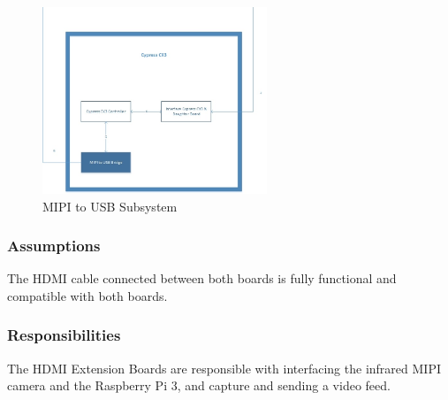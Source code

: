 \begin{figure}[h!]
	\centering
	\includegraphics[width=0.60\textwidth]{images/Cypress_MIPI}
	\caption{MIPI to USB Subsystem}
\end{figure}

\subsubsection{Assumptions}
The HDMI cable connected between both boards is fully functional and compatible with both boards.

\subsubsection{Responsibilities}
The HDMI Extension Boards are responsible with interfacing the infrared MIPI camera and the Raspberry Pi 3, and capture and sending a video feed.

